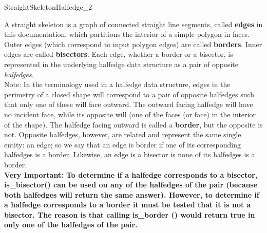 


\begin{ccRefConcept}{StraightSkeletonHalfedge_2}



A straight skeleton is a graph of connected straight line segments, called \textbf{edges} in this documentation, which partitions the interior of a simple polygon in faces. Outer edges (which correspond to input polygon edges) are called \textbf{borders}. Inner edges are called \textbf{bisectors}. Each edge, whether a border or a bisector, is represented in the underlying halfedge data structure as a pair of opposite \textit{halfedges}.\\

Note: In the terminology used in a halfedge data structure, edges in the perimetry of a closed shape will correspond to a pair of opposite halfedges such that only one of these will face outward. The outward facing halfedge will have no incident face, while its opposite will (one of the faces (or face) in the interior of the shape). The halfedge facing outward is called a \textbf{border}, but the opposite is not. Opposite halfedges, however, are related and represent the same single entity: an edge; so we say that an edge is border if one of its corresponding halfedges is a border. Likewise, an edge is a bisector is none of its halfedges is a border.\\

\textbf{Very Important: To determine if a halfedge corresponds to a bisector, is\_bisector() can be used on any of the halfedges of the pair (because both halfedges will return the same answer). However, to determine if a halfedge corresponds to a border it must be tested that it is not a bisector. The reason is that calling is\_border () would return true in only one of the halfedges of the pair.}


\end{ccRefConcept}
